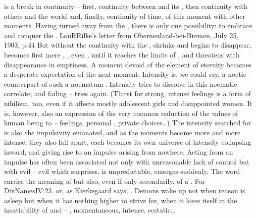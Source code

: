  is a break in continuity -- first, continuity between
 and its , then continuity with others and the world
and, finally, continuity of time, of this moment with other moments.  Having
turned away from the , there is only one possibility: to embrace
and conquer the . \citet{What is remote is no longer important, only
  yesterday; and tomorrow is more than eternity.}{LouR}{Rilke's letter from
  Oberneuland-bei-Bremen, July 25, 1903, p.44} But without the continuity with
the ,  shrinks and begins to disappear, becomes first
mere , , even , until it reaches the
limits of , and threatens with disappearance in emptiness.  A
moment devoid of the element of eternity becomes a desperate expectation of the
next moment.  Intensity is, we could say, a noetic counterpart of such a
noematum .  Intensity tries to dissolve in this noematic correlate,
and failing -- tries again.  (Thirst for strong, intense feelings is a form of
nihilism, too, even if it affects mostly adolescent girls and disappointed
women. It is, however, also an expression of the very common reduction of the
values of human being to  -- feelings, personal
, private choices\ldots)
The intensity searched for is also the impulsivity emanated, and as the moments
become more and more intense, they also fall apart, each becomes its own
universe of intensity collapsing inward, and giving rise to an impulse arising
from nowhere.  Acting from an impulse has often been associated not only with
unreasonable lack of control but with evil -- evil which surprises, is
unpredictable, emerges suddenly. The word  carries the meaning of
 but also, even if only secondarily, of a
. For \citet{evil is
  unstable}{DivNames}{IV:23. } or, as Kierkegaard says, . Demons wake up not when reason is asleep but when it has nothing
higher to strive for, when it loses itself in the insatiability of  and
 -- , momentaneous, intense, ecstatic\ldots


